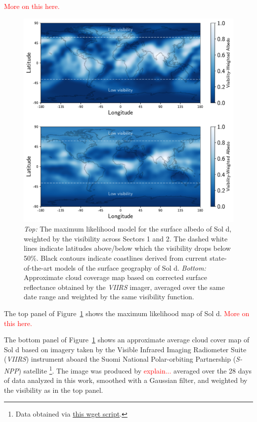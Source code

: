 \documentclass[modern]{aastex62}
\newcommand{\todo}[1]{\textcolor{red}{#1}}
\begin{document}
\todo{More on this here.}

\begin{figure}[p!]
    \begin{centering}
    \includegraphics[width=\linewidth]{figures/map.pdf}
    \caption{\label{fig:map}
             \emph{Top:} The maximum likelihood model for the surface albedo
             of Sol d, weighted by the visibility across Sectors 1 and 2. The
             dashed white lines indicate latitudes above/below which the
             visibility drops below 50\%. Black contours indicate coastlines
             derived from current state-of-the-art models of the surface geography 
             of Sol d.
             \emph{Bottom:} Approximate cloud coverage map based on corrected
             surface reflectance obtained by the
             \emph{VIIRS} imager, averaged over the same date range and weighted
             by the same visibility function.
             }
    \end{centering}
\end{figure}



The top panel of Figure~\ref{fig:map} shows the maximum likelihood map of Sol d.
\todo{More on this here.}

The bottom panel of Figure~\ref{fig:map} shows an approximate average
cloud cover map of Sol d based on imagery taken by the
Visible Infrared Imaging Radiometer Suite (\emph{VIIRS}) instrument aboard the 
Suomi National Polar-orbiting Partnership (\emph{S-NPP}) satellite
\footnote{Data obtained via 
\href{https://github.com/rodluger/earthshine/blob/master/tex/figures/viirs.sh}{this wget script}.}. 
The image was produced by \todo{explain...}
averaged over the 28 days of data analyzed in this work, smoothed with a Gaussian
filter, and weighted by the \tess visibility as in the top panel.
\end{document}
